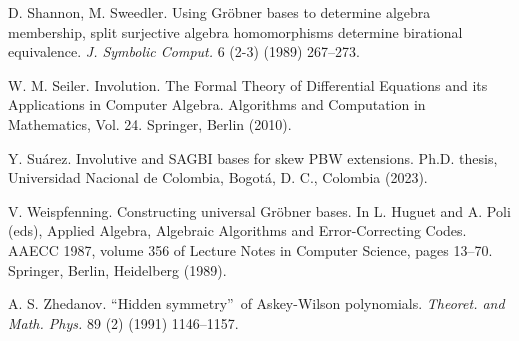 \documentclass{amsart}
\theoremstyle{definition}
\theoremstyle{remark}
\numberwithin{equation}{section}
\begin{document}
\begin{thebibliography}{}
 D. Shannon, M. Sweedler. Using Gr\"obner bases to determine algebra membership, split surjective algebra homomorphisms determine birational equivalence. {\em J. Symbolic Comput.} 6 (2-3) (1989) 267--273.

 W. M. Seiler. Involution. The Formal Theory of Differential Equations and its Applications in Computer Algebra. Algorithms and Computation in Mathematics, Vol. 24. Springer, Berlin (2010).

 Y. Su\'arez. Involutive and SAGBI bases for skew PBW extensions. Ph.D. thesis, Universidad Nacional de Colombia, Bogot\'a, D. C., Colombia (2023).

 V. Weispfenning. Constructing universal {G}r\"obner bases. In L. Huguet and A. Poli (eds), Applied Algebra, Algebraic Algorithms and Error-Correcting Codes. AAECC 1987, volume 356 of Lecture Notes in Computer Science, pages 13--70. Springer, Berlin, Heidelberg (1989).

 A. S. Zhedanov. \textquotedblleft Hidden symmetry\textquotedblright\ of Askey-Wilson polynomials. {\em Theoret. and Math. Phys.} 89 (2) (1991) 1146--1157.

\end{thebibliography}
\end{document}
